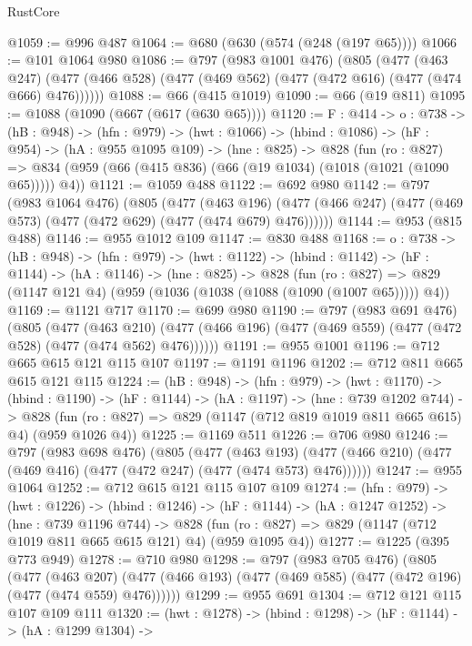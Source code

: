 \begin{lexlean}{RustCore}
\begin{coremodule}
@1059 := @996 @487
@1064 := @680 (@630 (@574 (@248 (@197 @65))))
@1066 := @101 @1064 @980
@1086 := @797
    (@983 @1001 @476)
    (@805
      (@477
        (@463 @247)
        (@477 (@466 @528) (@477 (@469 @562) (@477 (@472 @616) (@477 (@474 @666) @476))))))
@1088 := @66 (@415 @1019)
@1090 := @66 (@19 @811)
@1095 := @1088 (@1090 (@667 (@617 (@630 @65))))
@1120 := {F : @414} ->
  {o : @738} ->
  (hB : @948) ->
  (hfn : @979) ->
  (hwt : @1066) ->
  (hbind : @1086) ->
  (hF : @954) ->
  (hA : @955 @1095 @109) ->
  (hne : @825) ->
  @828
    (fun (ro : @827) =>
    @834 (@959 (@66 (@415 @836) (@66 (@19 @1034) (@1018 (@1021 (@1090 @65))))) @4))
@1121 := @1059 @488
@1122 := @692 @980
@1142 := @797
    (@983 @1064 @476)
    (@805
      (@477
        (@463 @196)
        (@477 (@466 @247) (@477 (@469 @573) (@477 (@472 @629) (@477 (@474 @679) @476))))))
@1144 := @953 (@815 @488)
@1146 := @955 @1012 @109
@1147 := @830 @488
@1168 := {o : @738} ->
  (hB : @948) ->
  (hfn : @979) ->
  (hwt : @1122) ->
  (hbind : @1142) ->
  (hF : @1144) ->
  (hA : @1146) ->
  (hne : @825) ->
  @828
    (fun (ro : @827) => @829 (@1147 @121 @4) (@959 (@1036 (@1038 (@1088 (@1090 (@1007 @65))))) @4))
@1169 := @1121 @717
@1170 := @699 @980
@1190 := @797
    (@983 @691 @476)
    (@805
      (@477
        (@463 @210)
        (@477 (@466 @196) (@477 (@469 @559) (@477 (@472 @528) (@477 (@474 @562) @476))))))
@1191 := @955 @1001
@1196 := @712 @665 @615 @121 @115 @107
@1197 := @1191 @1196
@1202 := @712 @811 @665 @615 @121 @115
@1224 := (hB : @948) ->
  (hfn : @979) ->
  (hwt : @1170) ->
  (hbind : @1190) ->
  (hF : @1144) ->
  (hA : @1197) ->
  (hne : @739 @1202 @744) ->
  @828 (fun (ro : @827) => @829 (@1147 (@712 @819 @1019 @811 @665 @615) @4) (@959 @1026 @4))
@1225 := @1169 @511
@1226 := @706 @980
@1246 := @797
    (@983 @698 @476)
    (@805
      (@477
        (@463 @193)
        (@477 (@466 @210) (@477 (@469 @416) (@477 (@472 @247) (@477 (@474 @573) @476))))))
@1247 := @955 @1064
@1252 := @712 @615 @121 @115 @107 @109
@1274 := (hfn : @979) ->
  (hwt : @1226) ->
  (hbind : @1246) ->
  (hF : @1144) ->
  (hA : @1247 @1252) ->
  (hne : @739 @1196 @744) ->
  @828 (fun (ro : @827) => @829 (@1147 (@712 @1019 @811 @665 @615 @121) @4) (@959 @1095 @4))
@1277 := @1225 (@395 @773 @949)
@1278 := @710 @980
@1298 := @797
    (@983 @705 @476)
    (@805
      (@477
        (@463 @207)
        (@477 (@466 @193) (@477 (@469 @585) (@477 (@472 @196) (@477 (@474 @559) @476))))))
@1299 := @955 @691
@1304 := @712 @121 @115 @107 @109 @111
@1320 := (hwt : @1278) ->
  (hbind : @1298) ->
  (hF : @1144) ->
  (hA : @1299 @1304) ->

\end{coremodule}
\end{lexlean}
